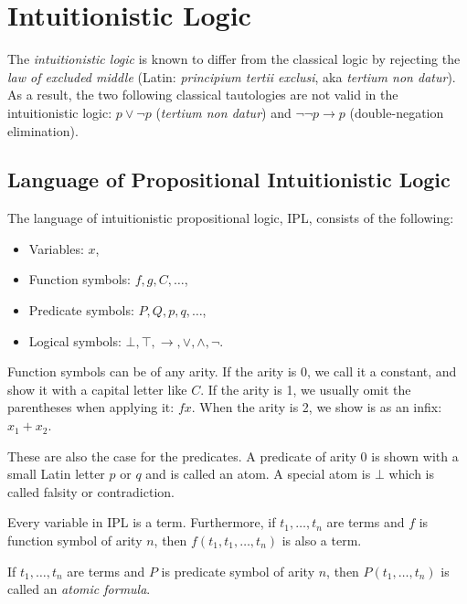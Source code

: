 \section{Intuitionistic Logic}

The \textit{intuitionistic logic} is known to differ from the classical logic by rejecting the \textit{law of excluded middle} (Latin: \textit{principium tertii exclusi}, aka \textit{tertium non datur}). As a result, the two following classical tautologies are not valid in the intuitionistic logic: $p \vee \neg p$ (\textit{tertium non datur}) and $\neg \neg p \rightarrow p$ (double-negation elimination).

\subsection{Language of Propositional Intuitionistic Logic}

The language of intuitionistic propositional logic, IPL, consists of the following:

\begin{itemize}
    \item Variables: $x$,
    \item Function symbols: $f, g, C, \dots$,
    \item Predicate symbols: $P, Q, p, q, \dots$,
    \item Logical symbols: $\bot, \top, \rightarrow, \vee, \wedge, \neg$.
\end{itemize}

Function symbols can be of any arity. If the arity is 0, we call it a constant, and show it with a capital letter like $C$. If the arity is 1, we usually omit the parentheses when applying it: $fx$. When the arity is 2, we show is as an infix: $x_1 + x_2$.

These are also the case for the predicates. A predicate of arity 0 is shown with a small Latin letter $p$ or $q$ and is called an atom. A special atom is $\bot$ which is called falsity or contradiction.

\begin{definition}[Term]
Every variable in IPL is a term. Furthermore, if $t_1, \dots, t_n$ are terms and $f$ is function symbol of arity $n$, then $f(t_1, t_1, \dots, t_{n})$ is also a term.
\end{definition}

\begin{definition}
If $t_1, \dots, t_n$ are terms and $P$ is predicate symbol of arity $n$, then $P(t_1, \dots, t_n)$ is called an \textit{atomic formula}.
\end{definition}

